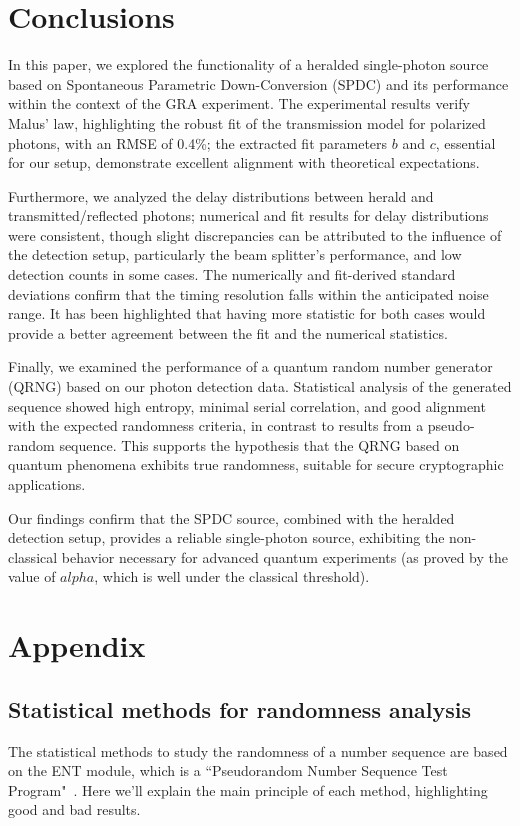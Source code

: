 \documentclass[prl,twocolumn]{revtex4-1}
\begin{document}
\section{Conclusions}
In this paper, we explored the functionality of a heralded single-photon source based on Spontaneous Parametric Down-Conversion (SPDC) and its performance within the context of the GRA experiment. The experimental results verify Malus’ law, highlighting the robust fit of the transmission model for polarized photons, with an RMSE of 0.4\%; the extracted fit parameters $b$ and $c$, essential for our setup, demonstrate excellent alignment with theoretical expectations.

Furthermore, we analyzed the delay distributions between herald and transmitted/reflected photons; numerical and fit results for delay distributions were consistent, though slight discrepancies can be attributed to the influence of the detection setup, particularly the beam splitter’s performance, and low detection counts in some cases. The numerically and fit-derived standard deviations confirm that the timing resolution falls within the anticipated noise range. It has been highlighted that having more statistic for both cases would provide a better agreement between the fit and the numerical statistics.

Finally, we examined the performance of a quantum random number generator (QRNG) based on our photon detection data. Statistical analysis of the generated sequence showed high entropy, minimal serial correlation, and good alignment with the expected randomness criteria, in contrast to results from a pseudo-random sequence. This supports the hypothesis that the QRNG based on quantum phenomena exhibits true randomness, suitable for secure cryptographic applications.

Our findings confirm that the SPDC source, combined with the heralded detection setup, provides a reliable single-photon source, exhibiting the non-classical behavior necessary for advanced quantum experiments (as proved by the value of $alpha$, which is well under the classical threshold).


\section{Appendix}
\subsection{Statistical methods for randomness analysis}
\label{sec:appendix_random}
The statistical methods to study the randomness of a number sequence are based on the ENT module, which is a ``Pseudorandom Number Sequence Test Program"~\cite{fourmilab}. Here we'll explain the main principle of each method, highlighting good and bad results. 
\end{document}

